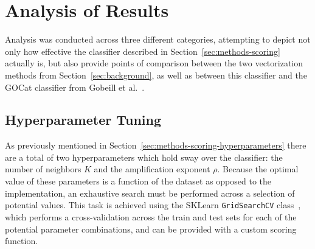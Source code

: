 \documentclass[11pt]{article}
\theoremstyle{plain}
\theoremstyle{definition}
\begin{document}
\section{Analysis of Results}\label{sec:analysis}

Analysis was conducted across three different categories, attempting to depict not only how effective the classifier described in Section~\ref{sec:methods-scoring} actually is, but also provide points of comparison between the two vectorization methods from Section~\ref{sec:background}, as well as between this classifier and the GOCat classifier from Gobeill et al.\ \cite{gobeill/2013/managing}.

\subsection{Hyperparameter Tuning}\label{sec:analsysis-tuning}

As previously mentioned in Section~\ref{sec:methods-scoring-hyperparameters} there are a total of two hyperparameters which hold sway over the classifier: the number of neighbors $K$ and the amplification exponent $\rho$. Because the optimal value of these parameters is a function of the dataset as opposed to the implementation, an exhaustive search must be performed across a selection of potential values. This task is achieved using the SKLearn \verb|GridSearchCV| class~\cite{sklearn/2026/gridsearchcv}, which performs a cross-validation across the train and test sets for each of the potential parameter combinations, and can be provided with a custom scoring function.
\end{document}
